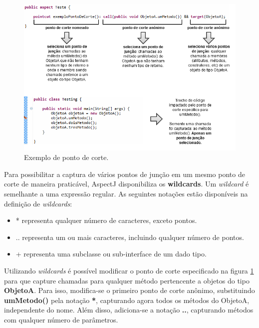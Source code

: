 \begin{figure}
	\centering
	\includegraphics{img/pointcut_vs_joinpoint.png}
	\caption{Exemplo de ponto de corte.}\label{fig:pointcut_vs_joinpoint}
\end{figure}

Para possibilitar a captura de vários pontos de junção em um mesmo ponto de
corte de maneira praticável, AspectJ disponibiliza os \textbf{wildcards}. 
Um \textit{wildcard} é semelhante a uma expressão regular. As seguintes notações
estão disponíveis na definição de \textit{wildcards}:

\begin{itemize}
  \item * representa qualquer número de caracteres, exceto pontos.
  \item .. representa um ou mais caracteres, incluindo qualquer número de
  pontos.
  \item + representa uma subclasse ou sub-interface de um dado tipo.
\end{itemize}

Utilizando \textit{wildcards} é possível modificar o ponto de corte especificado na figura \ref{fig:pointcut_vs_joinpoint} para que capture chamadas
para qualquer método pertencente a objetos do tipo \textbf{ObjetoA}. Para isso, modifica-se o primeiro ponto de corte anônimo, substituindo
\textbf{umMetodo()} pela notação \textbf{*}, capturando agora todos os métodos do ObjetoA, independente do nome. Além disso, adiciona-se a 
notação \textbf{..}, capturando métodos com qualquer número de parâmetros. 

